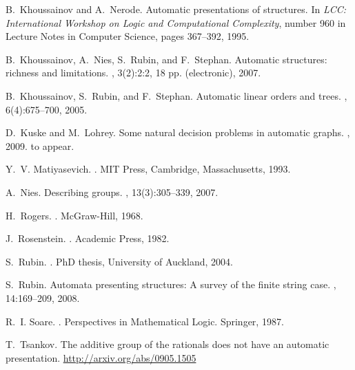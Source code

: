 \documentclass[envcountsame]{llncs}
\begin{document}
\begin{thebibliography}{10}
B.~Khoussainov and A.~Nerode.
\newblock Automatic presentations of structures.
\newblock In {\em LCC: International Workshop on Logic and Computational
  Complexity}, number 960 in Lecture Notes in Computer Science, pages 367--392,
  1995.

B.~Khoussainov, A.~Nies, S.~Rubin, and F.~Stephan.
\newblock Automatic structures: richness and limitations.
, 3(2):2:2, 18 pp.
  (electronic), 2007.

B.~Khoussainov, S.~Rubin, and F.~Stephan.
\newblock Automatic linear orders and trees.
, 6(4):675--700, 2005.

D.~Kuske and M.~Lohrey.
\newblock Some natural decision problems in automatic graphs.
, 2009.
\newblock to appear.

Y.~V. Matiyasevich.
.
\newblock MIT Press, Cambridge, Massachusetts, 1993.

A.~Nies.
\newblock Describing groups.
, 13(3):305--339, 2007.

H.~Rogers.
.
\newblock McGraw-Hill, 1968.

J.~Rosenstein.
.
\newblock Academic Press, 1982.

S.~Rubin.
.
\newblock PhD thesis, University of Auckland, 2004.

S.~Rubin.
\newblock Automata presenting structures: A survey of the finite string case.
, 14:169--209, 2008.

R.~I. Soare.
.
\newblock Perspectives in Mathematical Logic. Springer, 1987.

T.~Tsankov.
\newblock The additive group of the rationals does not have an automatic
  presentation.
\newblock \url{http://arxiv.org/abs/0905.1505}

\end{thebibliography}
\end{document}
